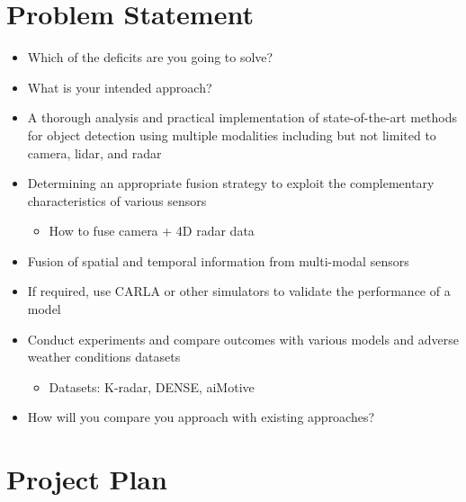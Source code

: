 \documentclass[rnd]{mas_proposal}
\begin{document}
\section{Problem Statement}
\begin{itemize}
    
    \item Which of the deficits are you going to solve?
    
    \item What is your intended approach?
    \item A thorough analysis and practical implementation of state-of-the-art methods for object detection using multiple modalities including but not limited to camera, lidar, and radar
        
    \item Determining an appropriate fusion strategy to exploit the complementary characteristics of various sensors
    \begin{itemize}
        \item How to fuse camera + 4D radar data
    \end{itemize}
    
    \item Fusion of spatial and temporal information from multi-modal sensors

    \item If required, use CARLA or other simulators to validate the performance of a model 
    
    \item Conduct experiments and compare outcomes with various models and adverse weather conditions datasets
    \begin{itemize}
        \item Datasets: K-radar\cite{Paek2022Jun}, DENSE\cite{bijelic2020seeing}, aiMotive\cite{Matuszka2022Nov}
    \end{itemize}    


    \item How will you compare you approach with existing approaches?
\end{itemize}

\section{Project Plan}
\end{document}
